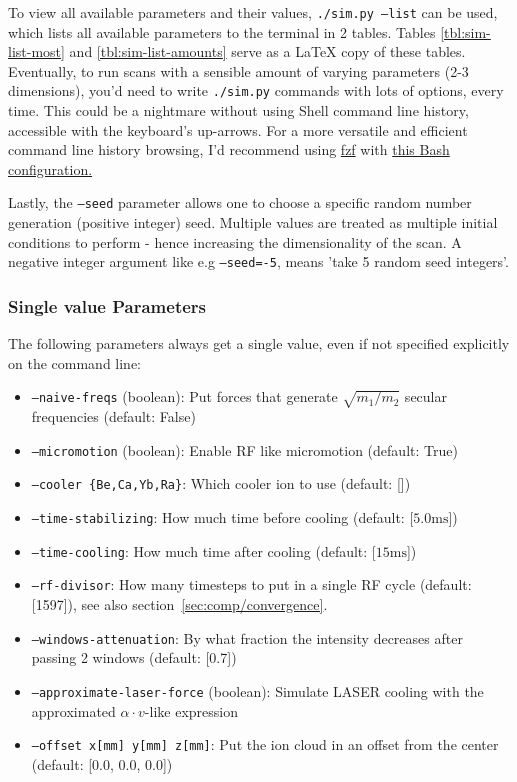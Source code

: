 To view all available parameters and their values, \texttt{./sim.py --list} can be used, which lists all available parameters to the terminal in 2 tables. Tables \ref{tbl:sim-list-most} and \ref{tbl:sim-list-amounts} serve as a LaTeX copy of these tables. Eventually, to run scans with a sensible amount of varying parameters (2-3 dimensions), you'd need to write \texttt{./sim.py} commands with lots of options, every time. This could be a nightmare without using Shell command line history, accessible with the keyboard's up-arrows. For a more versatile and efficient command line history browsing, I'd recommend using \href{https://github.com/junegunn/fzf}{fzf} with \href{https://github.com/junegunn/fzf/blob/d24b58ef3fc6d6d2c43e07a44e0f757b9bdfbeff/shell/key-bindings.bash#L133-L136}{this Bash configuration.}

Lastly, the \texttt{--seed} parameter allows one to choose a specific random number generation (positive integer) seed. Multiple values are treated as multiple initial conditions to perform - hence increasing the dimensionality of the scan. A negative integer argument like e.g \texttt{--seed=-5}, means 'take 5 random seed integers'.

\subsubsection{Single value Parameters}\label{sssec:manual/single-value-params}

The following parameters always get a single value, even if not specified explicitly on the command line:

\begin{itemize}%
    \item \texttt{--naive-freqs} (boolean): Put forces that generate $\sqrt{m_1/m_2}$ secular frequencies (default: False)
    \item \texttt{--micromotion} (boolean): Enable RF like micromotion (default: True)
    \item \texttt{--cooler \{Be,Ca,Yb,Ra\}}: Which cooler ion to use (default: [])
    \item \texttt{--time-stabilizing}: How much time before cooling (default: [$5.0 \mathrm{ms}$])
    \item \texttt{--time-cooling}: How much time after cooling (default: [$15 \mathrm{ms}$])
    \item \texttt{--rf-divisor}: How many timesteps to put in a single RF cycle (default: [1597]), see also section~\ref{sec:comp/convergence}.
    \item \texttt{--windows-attenuation}: By what fraction the intensity decreases after passing 2 windows (default: [0.7])
    \item \texttt{--approximate-laser-force} (boolean): Simulate LASER cooling with the approximated $\alpha \cdot v$-like expression
    \item \texttt{--offset x[mm] y[mm] z[mm]}: Put the ion cloud in an offset from the center (default: [0.0, 0.0, 0.0])
\end{itemize}


